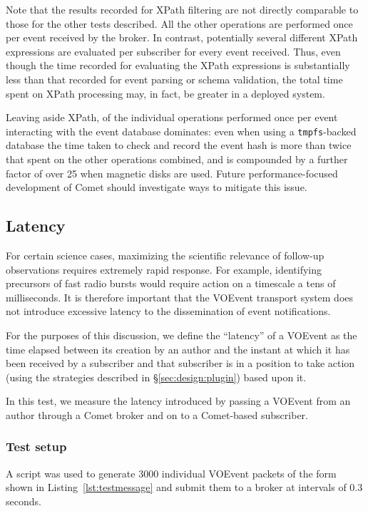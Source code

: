 \documentclass[5p,authoryear]{elsarticle}
\begin{document}
Note that the results recorded for XPath filtering are not directly comparable
to those for the other tests described. All the other operations are performed
once per event received by the broker. In contrast, potentially several
different XPath expressions are evaluated per subscriber for every event
received. Thus, even though the time recorded for evaluating the XPath
expressions is substantially less than that recorded for event parsing or
schema validation, the total time spent on XPath processing may, in fact, be
greater in a deployed system.

Leaving aside XPath, of the individual operations performed once per event
interacting with the event database dominates: even when using a
\texttt{tmpfs}-backed database the time taken to check and record the event
hash is more than twice that spent on the other operations combined, and is
compounded by a further factor of over 25 when magnetic disks are used. Future
performance-focused development of Comet should investigate ways to mitigate
this issue.


\subsection{Latency}
\label{sec:perf:latency}

For certain science cases, maximizing the scientific relevance of follow-up
observations requires extremely rapid response. For example, identifying
precursors of fast radio bursts \citep{Thornton:2013} would require action on
a timescale a tens of milliseconds. It is therefore important that the VOEvent
transport system does not introduce excessive latency to the dissemination of
event notifications.

For the purposes of this discussion, we define the ``latency'' of a VOEvent as
the time elapsed between its creation by an author and the instant at which it
has been received by a subscriber and that subscriber is in a position to take
action (using the strategies described in \S\ref{sec:design:plugin}) based
upon it.

In this test, we measure the latency introduced by passing a VOEvent from an
author through a Comet broker and on to a Comet-based subscriber.

\subsubsection{Test setup}
\label{sec:perf:latency:setup}

A script was used to generate 3000 individual VOEvent packets of the form
shown in Listing~\ref{lst:testmessage} and submit them to a broker at
intervals of 0.3 seconds.
\end{document}
